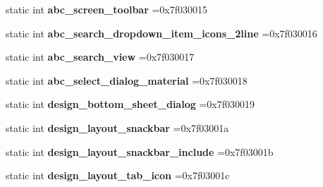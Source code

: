 \begin{DoxyCompactItemize}
static int {\bfseries abc\+\_\+screen\+\_\+toolbar} =0x7f030015
\item 
\mbox{\label{classandroid_1_1support_1_1v7_1_1appcompat_1_1R_1_1layout_a1ac41a4a5fb75129936beaf498b5280c}} 
static int {\bfseries abc\+\_\+search\+\_\+dropdown\+\_\+item\+\_\+icons\+\_\+2line} =0x7f030016
\item 
\mbox{\label{classandroid_1_1support_1_1v7_1_1appcompat_1_1R_1_1layout_a5c9e6a8276f2024f8b63406dd8808795}} 
static int {\bfseries abc\+\_\+search\+\_\+view} =0x7f030017
\item 
\mbox{\label{classandroid_1_1support_1_1v7_1_1appcompat_1_1R_1_1layout_abe4e68bf4521fa3a56cfe5c471724977}} 
static int {\bfseries abc\+\_\+select\+\_\+dialog\+\_\+material} =0x7f030018
\item 
\mbox{\label{classandroid_1_1support_1_1v7_1_1appcompat_1_1R_1_1layout_a58f9d2ffce1602242b18e3f8c1c8fdd8}} 
static int {\bfseries design\+\_\+bottom\+\_\+sheet\+\_\+dialog} =0x7f030019
\item 
\mbox{\label{classandroid_1_1support_1_1v7_1_1appcompat_1_1R_1_1layout_a91738c7b32f5b946619fad6b2686758c}} 
static int {\bfseries design\+\_\+layout\+\_\+snackbar} =0x7f03001a
\item 
\mbox{\label{classandroid_1_1support_1_1v7_1_1appcompat_1_1R_1_1layout_a418ab8134b6af40562d2be1d70e875ef}} 
static int {\bfseries design\+\_\+layout\+\_\+snackbar\+\_\+include} =0x7f03001b
\item 
\mbox{\label{classandroid_1_1support_1_1v7_1_1appcompat_1_1R_1_1layout_a0202ccca6f8a6e0fc118ac975bd123d0}} 
static int {\bfseries design\+\_\+layout\+\_\+tab\+\_\+icon} =0x7f03001c
\item 
\mbox{\label{classandroid_1_1support_1_1v7_1_1appcompat_1_1R_1_1layout_abe78c936bcff4f1159694432b45c4ddb}} 

\end{DoxyCompactItemize}
